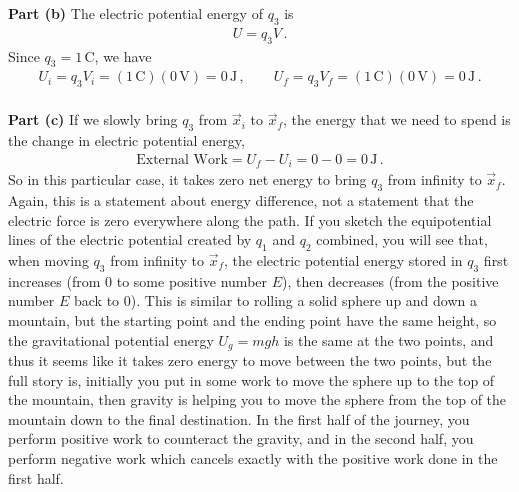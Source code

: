 \documentclass[11pt]{article}
\begin{document}
\noindent\textbf{Part (b)} The electric potential energy of $q_3$ is
\begin{align*}
U = q_3V\,.
\end{align*}
Since $q_3=1$\,C, we have
\begin{align*}
U_i = q_3V_i = (1\,\text{C})(0\,\text{V})=0\,\text{J}\,,\qquad
U_f = q_3V_f = (1\,\text{C})(0\,\text{V})=0\,\text{J}\,.\\
\end{align*}

\noindent\textbf{Part (c)} If we slowly bring $q_3$ from $\vec{x}_i$ to $\vec{x}_f$, the energy that we need to spend is the change in electric potential energy,
\begin{align*}
\text{External Work}= U_f-U_i = 0-0=0\,\text{J}\,.
\end{align*}
So in this particular case, it takes zero net energy to bring $q_3$ from infinity to $\vec{x}_f$. Again, this is a statement about energy difference, not a statement that the electric force is zero everywhere along the path. If you sketch the equipotential lines of the electric potential created by $q_1$ and $q_2$ combined, you will see that, when moving $q_3$ from infinity to $\vec{x}_f$, the electric potential energy stored in $q_3$ first increases (from $0$ to some positive number $E$), then decreases (from the positive number $E$ back to $0$). This is similar to rolling a solid sphere up and down a mountain, but the starting point and the ending point have the same height, so the gravitational potential energy $U_g = mgh$ is the same at the two points, and thus it seems like it takes zero energy to move between the two points, but the full story is, initially you put in some work to move the sphere up to the top of the mountain, then gravity is helping you to move the sphere from the top of the mountain down to the final destination. In the first half of the journey, you perform positive work to counteract the gravity, and in the second half, you perform negative work which cancels exactly with the positive work done in the first half. \\
\end{document}
